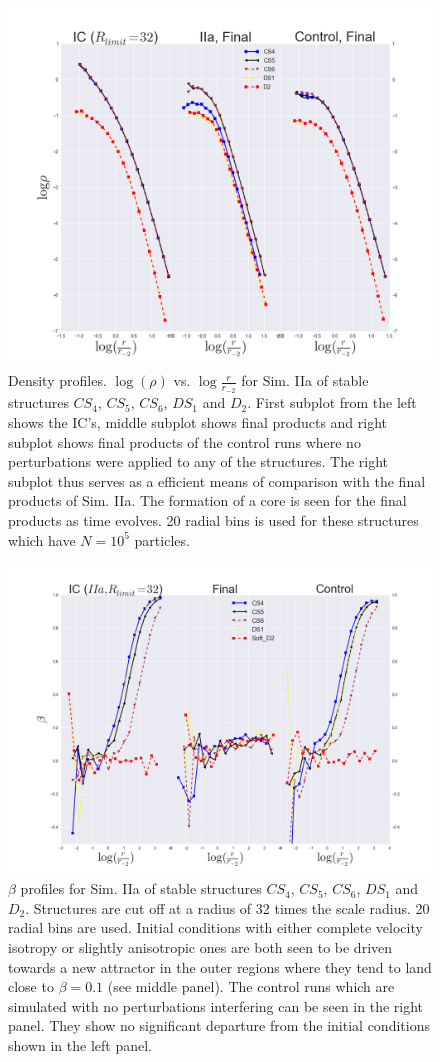 \begin{figure}[!htbp]
\centering
\includegraphics[width=1.0\linewidth]{img/logr_logrho.png}
\caption{Density profiles. $\log (\rho)$ vs. $\log \frac{r}{r_{-2}}$ for Sim. IIa of stable structures $CS_4$, $CS_5$, $CS_6$, $DS_1$ and $D_2$. First subplot from the left shows the IC's, middle subplot shows final products and right subplot shows final products of the control runs where no perturbations were applied to any of the structures. The right subplot thus serves as a efficient means of comparison with the final products of Sim. IIa. The formation of a core is seen for the final products as time evolves. 20 radial bins is used for these structures which have $N = 10^5$ particles.}
\label{fig:test}
\end{figure}

\begin{figure}[!htbp]
\centering
\includegraphics[width=1.0 cm]{img/log_r_r2_beta_CS4CS5CS6DS1D2_Rlimit32.png}
\caption{$\beta$ profiles for Sim. IIa of stable structures $CS_4$, $CS_5$, $CS_6$, $DS_1$ and $D_2$.
Structures are cut off at a radius of 32 times the scale radius. 20 radial bins are used. 
Initial conditions with either complete velocity isotropy or slightly anisotropic ones are both seen to be driven towards a new attractor
in the outer regions where they tend to land close to $\beta = 0.1$ (see middle panel).
The control runs which are simulated with no perturbations interfering can be seen in the right panel.
They show no significant departure from the initial conditions shown in the left panel.}
\label{fig:test}
\end{figure}

